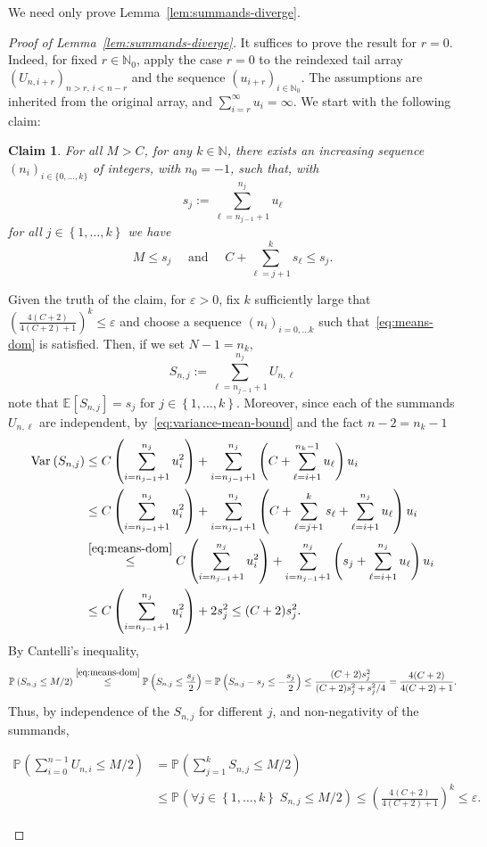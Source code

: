 \documentclass[12pt]{article}
\newtheorem{clm}{Claim}[thm]
\theoremstyle{definition}
\newcommand{\E}[2][]{\ensuremath{\mathbb{E}_{#1}\left[#2 \right]}}
\newcommand{\Prob}[2][]{\ensuremath{\mathbb{P}_{#1} \left(#2 \right)}}
\newcommand{\Var}[2][]{\operatorname{Var}_{#1}\left(#2\right)}
\newcommand{\eps}{\varepsilon}
\begin{document}
We need only prove Lemma~\ref{lem:summands-diverge}.
\begin{proof}[Proof of Lemma~\ref{lem:summands-diverge}]
It suffices to prove the result for $r=0$. Indeed, for fixed $r\in\mathbb{N}_0$, apply the case $r=0$ to the reindexed tail array $(U_{n,i+r})_{n>r,\,i<n-r}$ and the sequence $(u_{i+r})_{i\in \mathbb{N}_0}$. The assumptions are inherited from the original array, and $\sum_{i=r}^{\infty}u_i=\infty$.
We start with the following claim:
\begin{clm} \label{clm:div-sum-ineq}
    For all $M>C$, for any $k \in \mathbb{N}$, there exists an increasing sequence $(n_{i})_{i \in \{0, \ldots, k\}}$ of integers, with $n_{0} = -1$, such that, with
    \[
    s_{j} := 
    \sum_{\ell = n_{j-1}+1}^{n_{j}} u_{\ell}
    \]
    for all $j \in \left\{1, \ldots, k \right\}$ we have 
    \begin{equation} \label{eq:means-dom}
     M \leq s_{j} \quad \text{ and } \quad C + \sum_{\ell = j+1}^{k} s_{\ell} \leq s_{j}.
    \end{equation} 
\end{clm}
Given the truth of the claim, for $\eps > 0$, fix $k$ sufficiently large that $\left(\frac{4(C+2)}{4(C+2)+1}\right)^k \leq \eps$ and choose a sequence $(n_{i})_{i = 0, \ldots k}$ such that~\eqref{eq:means-dom} is satisfied. Then, if we set $N -1 = n_{k}$,
\[
S_{n, j} :=
\sum_{\ell=n_{j-1}+1}^{n_{j}} U_{n, \ell} 
\]
note that $\E{S_{n,j}} = s_{j}$ for $j \in \left\{ 1, \ldots, k\right\}$. Moreover, since each of the summands $U_{n, \ell}$ are independent, by~\eqref{eq:variance-mean-bound} and the fact $n -2 = n_{k}-1$
\begin{align*}
\Var{S_{n,j}} & \leq C\left(\sum_{i=n_{j-1}+1}^{n_{j}} u_{i}^2\right) + \sum_{i=n_{j-1}+1}^{n_{j}} \left(C + \sum_{\ell=i+1}^{n_{k}-1} u_{\ell}\right)u_{i}
\\ & \leq  C\left(\sum_{i=n_{j-1}+1}^{n_{j}} u_{i}^2\right) + \sum_{i=n_{j-1}+1}^{n_{j}} \left(C + \sum_{\ell = j+1}^{k} s_{\ell} + \sum_{\ell=i+1}^{n_{j}} u_{\ell}\right)u_{i}
\\ & \stackrel{\eqref{eq:means-dom}}{\leq} C\left(\sum_{i=n_{j-1}+1}^{n_{j}} u_{i}^2\right) + \sum_{i=n_{j-1}+1}^{n_{j}} \left(s_{j} + \sum_{\ell=i+1}^{n_{j}} u_{\ell}\right)u_{i} 
\\ & \leq C\left(\sum_{i=n_{j-1}+1}^{n_{j}} u_{i}^2\right) + 2s_{j}^2 
\leq (C+2) s_{j}^2. 
 \end{align*}
By  Cantelli's inequality, 
\[
\Prob{S_{n,j} \leq M/2} \stackrel{\eqref{eq:means-dom}}{\leq} \Prob{S_{n,j} \leq \frac{s_{j}}{2}} = \Prob{S_{n,j} - s_{j} \leq - \frac{s_{j}}{2}} \leq \frac{(C+2)s_{j}^2}{(C+2)s_{j}^2 + s_{j}^2/4} = \frac{4(C+2)}{4(C+2) + 1}. 
\]
Thus, by independence of the $S_{n,j}$ for different $j$, and non-negativity of the summands,
\begin{linenomath}
\begin{align*}
\Prob{\sum_{i=0}^{n-1} U_{n,i} \leq M/2} & = \Prob{\sum_{j=1}^{k} S_{n,j} \leq M/2} \\ & \leq \Prob{\forall j\in\left\{1, \ldots, k\right\} \; S_{n,j} \leq M/2} \leq \left(\frac{4(C+2)}{4(C+2)+1}\right)^{k} \leq \eps. 
\end{align*}
\end{linenomath}
\end{proof}
\end{document}
